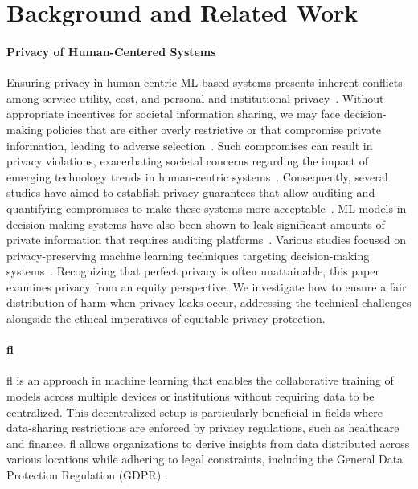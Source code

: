 \section{Background and Related Work}\label{sec:related}

\paragraph{\textbf{Privacy of Human-Centered Systems}}
Ensuring privacy in human-centric ML-based systems presents inherent conflicts among service utility, cost, and personal and institutional privacy~\cite{sztipanovits2019science}. Without appropriate incentives for societal information sharing, we may face decision-making policies that are either overly restrictive or that compromise private information, leading to adverse selection~\cite{jin2016enabling}. Such compromises can result in privacy violations, exacerbating societal concerns regarding the impact of emerging technology trends in human-centric systems~\cite{mulligan2016privacy,fox2021exploring,goldfarb2012shifts}. Consequently, several studies have aimed to establish privacy guarantees that allow auditing and quantifying compromises to make these systems more acceptable~\cite{jagielski2020auditing, raji2020saving}. ML models in decision-making systems have also been shown to leak significant amounts of private information that requires auditing platforms~\cite{hamon2022bridging}. Various studies focused on privacy-preserving machine learning techniques targeting decision-making systems~\cite{abadi2016deep, cummings2019compatibility, taherisadr2023adaparl, taherisadr2024hilt}. Recognizing that perfect privacy is often unattainable, this paper examines privacy from an equity perspective. We investigate how to ensure a fair distribution of harm when privacy leaks occur, addressing the technical challenges alongside the ethical imperatives of equitable privacy protection.


\paragraph{\textbf{\acf{fl}}}
\ac{fl} is an approach in machine learning that enables the collaborative training of models across multiple devices or institutions without requiring data to be centralized. This decentralized setup is particularly beneficial in fields where data-sharing restrictions are enforced by privacy regulations, such as healthcare and finance. \ac{fl} allows organizations to derive insights from data distributed across various locations while adhering to legal constraints, including the General Data Protection Regulation (GDPR) \cite{BG_Survey2,BG_Survey1}.

